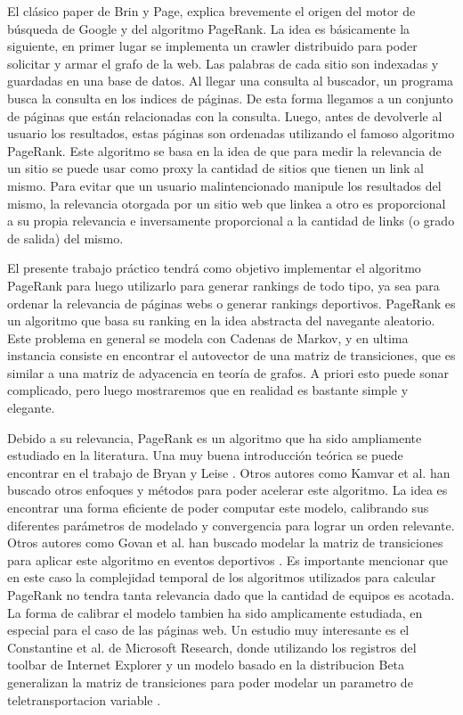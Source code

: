 El clásico paper de Brin y Page,  \cite{Brin1998} explica brevemente el origen del motor de búsqueda de Google y del algoritmo PageRank. La idea es básicamente la siguiente, en primer lugar se implementa un crawler distribuido para poder solicitar y armar el grafo de la web. Las palabras de cada sitio son indexadas y guardadas en una base de datos. Al llegar una consulta al buscador, un programa busca la consulta en los indices de páginas. De esta forma llegamos a un conjunto de páginas que están relacionadas con la consulta. Luego, antes de devolverle al usuario los resultados, estas páginas son ordenadas utilizando el famoso algoritmo PageRank. Este algoritmo se basa en la idea de que para medir la relevancia de un sitio se puede usar como proxy la cantidad de sitios que tienen un link al mismo. Para evitar que un usuario malintencionado manipule los resultados del mismo, la relevancia otorgada por un sitio web que linkea a otro es proporcional a su propia relevancia e inversamente proporcional a la cantidad de links (o grado de salida) del mismo.

El presente trabajo práctico tendrá como objetivo implementar el algoritmo PageRank para luego utilizarlo para generar rankings de todo tipo, ya sea para ordenar la relevancia de páginas webs o generar rankings deportivos. PageRank es un algoritmo que basa su ranking en la idea abstracta del navegante aleatorio. Este problema en general se modela con Cadenas de Markov, y en ultima instancia consiste en encontrar el autovector de una matriz de transiciones, que es similar a una matriz de adyacencia en teoría de grafos. A priori esto puede sonar complicado, pero luego mostraremos que en realidad es bastante simple y elegante.

Debido a su relevancia, PageRank es un algoritmo que ha sido ampliamente estudiado en la literatura. Una muy buena introducción teórica se puede encontrar en el trabajo de Bryan y Leise \cite{Bryan2006}. Otros autores como Kamvar et al. \cite{Kamvar2003} han buscado otros enfoques y métodos para poder acelerar este algoritmo. La idea es encontrar una forma eficiente de poder computar este modelo, calibrando sus diferentes parámetros de modelado y convergencia para lograr un orden relevante. Otros autores como Govan et al. han buscado modelar la matriz de transiciones para aplicar este algoritmo en eventos deportivos \cite{Govan2008}. Es importante mencionar que en este caso la complejidad temporal de los algoritmos utilizados para calcular PageRank no tendra tanta relevancia dado que la cantidad de equipos es acotada. La forma de calibrar el modelo tambien ha sido amplicamente estudiada, en especial para el caso de las páginas web. Un estudio muy interesante es el Constantine et al. de Microsoft Research, donde utilizando los registros del toolbar de Internet Explorer y un modelo basado en la distribucion Beta generalizan la matriz de transiciones para poder modelar un parametro de teletransportacion variable \cite{TeleParam}.

